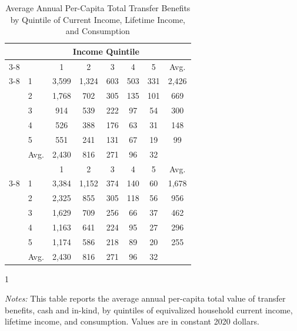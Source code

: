 \begin{table}[t]
\small
 \caption{Average Annual Per-Capita Total Transfer Benefits \\ by Quintile of Current Income, Lifetime Income, and Consumption}
 \label{tab:quintile_avgben}
\begin{tabular*}{\textwidth}{@{\extracolsep{\fill}}llcccccc@{}}
\toprule
                                      &   & \multicolumn{5}{c}{Income Quintile}                                                                    \\ \cmidrule{3-8}
                                      &   & 1                  & 2                  & 3                  & 4                  & 5        & Avg.            \\ \cmidrule{3-8}
\multirow{5}{*}{Consumption Quintile} & 1 & 3,599 & 1,324 & 603 & 503 & 331 & 2,426 \\
                                      & 2 & 1,768 & 702 & 305 & 135 & 101 & 669 \\
                                      & 3 & 914 & 539 & 222 & 97 & 54 & 300 \\
                                      & 4 & 526 & 388 & 176 & 63 & 31 & 148 \\
                                      & 5 & 551 & 241 & 131 & 67 & 19 & 99 \\
                                      & Avg. & 2,430 & 816 & 271 & 96 & 32 \\ \midrule
                                        &   & 1                  & 2                  & 3                  & 4                  & 5       & Avg.           \\ \cmidrule{3-8}
\multirow{5}{*}{Lifetime Income Quintile} & 1 & 3,384 & 1,152 & 374 & 140 & 60 & 1,678 \\
                                      & 2 & 2,325 & 855 & 305 & 118 & 56 & 956 \\
                                      & 3 & 1,629 & 709 & 256 & 66 & 37 & 462\\
                                      & 4 & 1,163 & 641 & 224 & 95 & 27 & 296\\
                                      & 5 & 1,174 & 586 & 218 & 89 & 20  & 255\\ 
                                      & Avg. & 2,430 & 816 & 271 & 96 & 32 \\\bottomrule
\end{tabular*}
            \begin{spacing}{1}
\begin{tablenotes}
       \item \footnotesize \textit{Notes:} This table reports the average annual per-capita total value of transfer benefits, cash and in-kind, by quintiles of equivalized household current income, lifetime income, and consumption. Values are in constant 2020 dollars.
      \end{tablenotes}
       \end{spacing}
\end{table}
    
